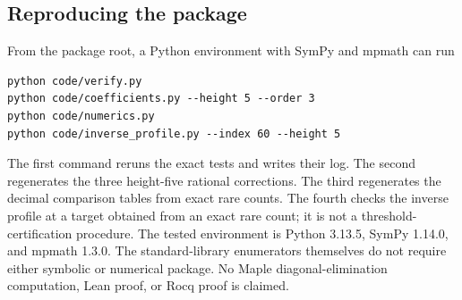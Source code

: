 \documentclass[11pt,letterpaper]{article}
\numberwithin{equation}{section}
\theoremstyle{definition}
\newcommand{\1}{\mathbf 1}
\begin{document}
\subsection{Reproducing the package}
From the package root, a Python environment with SymPy and mpmath can run
\begin{verbatim}
python code/verify.py
python code/coefficients.py --height 5 --order 3
python code/numerics.py
python code/inverse_profile.py --index 60 --height 5
\end{verbatim}
The first command reruns the exact tests and writes their log. The second
regenerates the three height-five rational corrections. The third
regenerates the decimal comparison tables from exact rare counts.
The fourth checks the inverse profile at a target obtained from an exact
rare count; it is not a threshold-certification procedure.
The tested environment is Python 3.13.5, SymPy 1.14.0, and mpmath 1.3.0.
The standard-library enumerators themselves do not require either
symbolic or numerical package. No Maple diagonal-elimination computation,
Lean proof, or Rocq proof is claimed.
\end{document}
